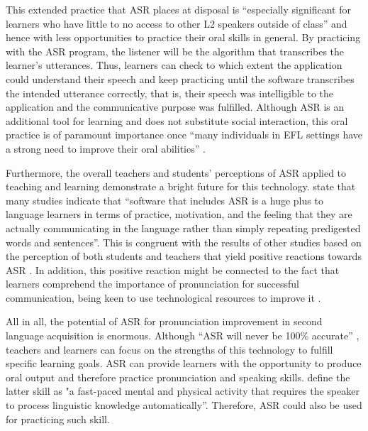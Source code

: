\documentclass[english]{textolivre}
\begin{document}
This extended practice that ASR places at disposal is “especially significant for learners who have little to no access to other L2 speakers outside of class” \cite[p. 108]{dizon_intelligent_2020} and hence with less opportunities to practice their oral skills in general. By practicing with the ASR program, the listener will be the algorithm that transcribes the learner’s utterances. Thus, learners can check to which extent the application could understand their speech and keep practicing until the software transcribes the intended utterance correctly, that is, their speech was intelligible to the application and the communicative purpose was fulfilled. Although ASR is an additional tool for learning and does not substitute social interaction, this oral practice is of paramount importance once “many individuals in EFL settings have a strong need to improve their oral abilities” \cite[p. 60]{chen_developing_2011}.

Furthermore, the overall teachers and students’ perceptions of ASR applied to teaching and learning demonstrate a bright future for this technology. \textcite[p. 319]{levis_2013} state that many studies indicate that “software that includes ASR is a huge plus to language learners in terms of practice, motivation, and the feeling that they are actually communicating in the language rather than simply repeating predigested words and sentences”. This is congruent with the results of other studies based on the perception of both students and teachers that yield positive reactions towards ASR \cite{chen_developing_2011, inceoglu_asr_2020}. In addition, this positive reaction might be connected to the fact that learners comprehend the importance of pronunciation for successful communication, being keen to use technological resources to improve it \cite{rogerson-revell_computer-assisted_2021}.

All in all, the potential of ASR for pronunciation improvement in second language acquisition is enormous. Although “ASR will never be 100\% accurate” \cite[p. 1641]{knill_impact_2018}, teachers and learners can focus on the strengths of this technology to fulfill specific learning goals. ASR can provide learners with the opportunity to produce oral output and therefore practice pronunciation and speaking skills. \textcite[p. 151]{chapelle_tips_2008} define the latter skill as "a fast-paced mental and physical activity that requires the speaker to process linguistic knowledge automatically”. Therefore, ASR could also be used for practicing such skill.
\end{document}
